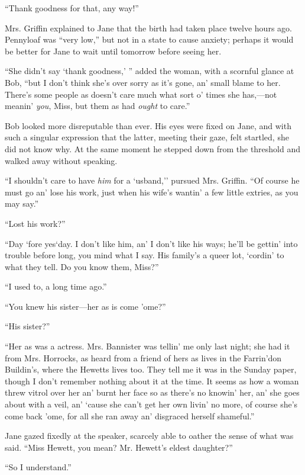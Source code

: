 ``Thank goodness for that, any way!''

Mrs. Griffin explained to Jane that the birth had taken place twelve
hours ago. Pennyloaf was ``very low,'' but not in a state to cause
anxiety; perhaps it would be better for Jane to wait until tomorrow
before seeing her.

``She didn't say `thank goodness,' '' added the woman, with a scornful
glance at Bob, ``but I don't think she's over sorry as it's gone, an'
small blame to her. There's some people as doesn't care much what sort
o' times she has,---not meanin' \emph{you}, Miss, but them as had
\emph{ought} to care.''

Bob looked more disreputable than ever. His eyes were fixed on Jane, and
with such a singular expression that the latter, meeting {}their gaze,
felt startled, she did not know why. At the same moment he stepped down
from the threshold and walked away without speaking.

``I shouldn't care to have \emph{him} for a `usband,'' pursued Mrs.
Griffin. ``Of course he must go an' lose his work, just when his wife's
wantin' a few little extries, as you may say.''

``Lost his work?''

``Day `fore yes`day. I don't like him, an' I don't like his ways; he'll
be gettin' into trouble before long, you mind what I say. His family's a
queer lot, `cordin' to what they tell. Do you know them, Miss?''

``I used to, a long time ago.''

``You knew his sister---her as is come 'ome?''

``His sister?''

``Her as was a actress. Mrs. Bannister was tellin' me only last night;
she had it from Mrs. Horrocks, as heard from a friend of hers as lives
in the Farrin'don Buildin's, where the Hewetts lives too. They tell me
it was in the Sunday paper, though I don't remember nothing about it at
the time. It seems as how a woman threw vitrol over her an' burnt her
face so as there's no knowin' her, an' she goes about with a veil, an'
`cause she can't get her {}own livin' no more, of course she's come back
'ome, for all she ran away an' disgraced herself shameful.''

Jane gazed fixedly at the speaker, scarcely able to oather the sense of
what was said. ``Miss Hewett, you mean? Mr. Hewett's eldest daughter?''

``So I understand.''

